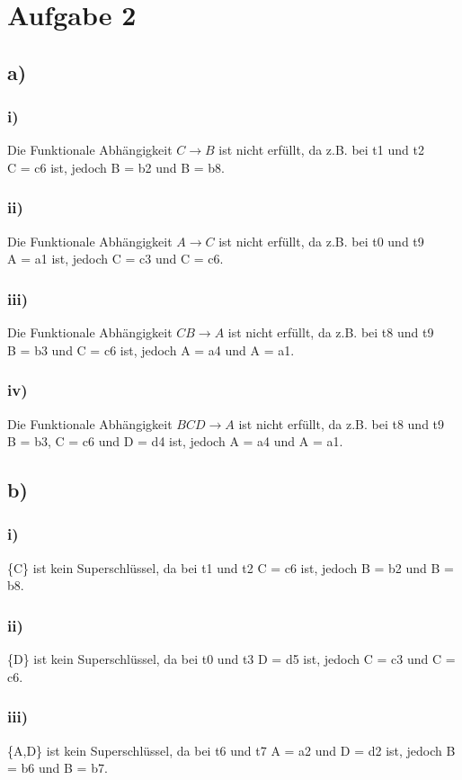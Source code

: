 \pagebreak
\section*{Aufgabe 2}
\subsection*{a)}
\subsubsection*{i)}
Die Funktionale Abhängigkeit $ C \rightarrow B $ ist nicht erfüllt, da z.B. bei t1 und t2 \\C = c6 ist, jedoch B = b2 und B = b8.
\subsubsection*{ii)}
Die Funktionale Abhängigkeit $ A \rightarrow C $ ist nicht erfüllt, da z.B. bei t0 und t9 \\A = a1 ist, jedoch C = c3 und C = c6.
\subsubsection*{iii)}
Die Funktionale Abhängigkeit $ CB \rightarrow A $ ist nicht erfüllt, da z.B. bei t8 und t9 \\B = b3 und C = c6 ist, jedoch A = a4 und A = a1.
\subsubsection*{iv)}
Die Funktionale Abhängigkeit $ BCD \rightarrow A $ ist nicht erfüllt, da z.B. bei t8 und t9 \\B = b3, C = c6 und D = d4 ist, jedoch A = a4 und A = a1.
\subsection*{b)}
\subsubsection*{i)}
\{C\} ist kein Superschlüssel, da bei t1 und t2 C = c6 ist, jedoch B = b2 und B = b8.
\subsubsection*{ii)}
\{D\} ist kein Superschlüssel, da bei t0 und t3 D = d5 ist, jedoch C = c3 und C = c6.
\subsubsection*{iii)}
\{A,D\} ist kein Superschlüssel, da bei t6 und t7 A = a2 und D = d2 ist, jedoch B = b6 und B = b7.
